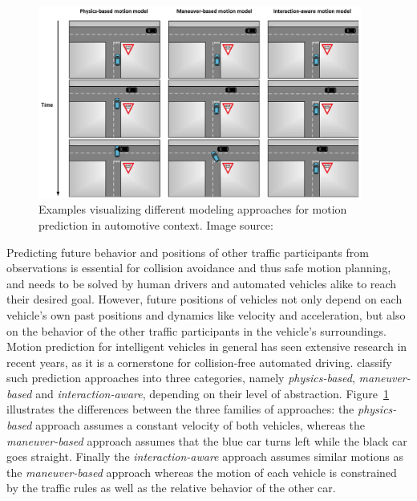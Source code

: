 \begin{figure}[t!]
	\centering
	\includegraphics[width=0.95\textwidth]{imgs/examples_motion_prediction_models.png}
	\caption{Examples visualizing different modeling approaches for motion prediction in automotive context. Image source: \textcite{Lefevre2014}}
	\label{fig:examples_motion_prediction_types}
\end{figure}

Predicting future behavior and positions of other traffic participants from observations is essential for collision avoidance and thus safe motion planning, and needs to be solved by human drivers and automated vehicles alike to reach their desired goal.
However, future positions of vehicles not only depend on each vehicle's own past positions and dynamics like  velocity and acceleration, but also on the behavior of the other traffic participants in the vehicle's surroundings.
Motion prediction for intelligent vehicles in general has seen extensive research in recent years, as it is a cornerstone for collision-free automated driving. 
\textcite{Lefevre2014} classify such prediction approaches into three categories, namely \emph{physics-based}, \emph{maneuver-based} and \emph{interaction-aware}, depending on their level of abstraction.
Figure~\ref{fig:examples_motion_prediction_types} illustrates the differences between the three families of approaches: the \emph{physics-based} approach assumes a constant velocity of both vehicles, whereas the \emph{maneuver-based} approach assumes that the blue car turns left while the black car goes straight.
Finally the \emph{interaction-aware} approach assumes similar motions as the \emph{maneuver-based} approach whereas the motion of each vehicle is constrained by the traffic rules as well as the relative behavior of the other car.

